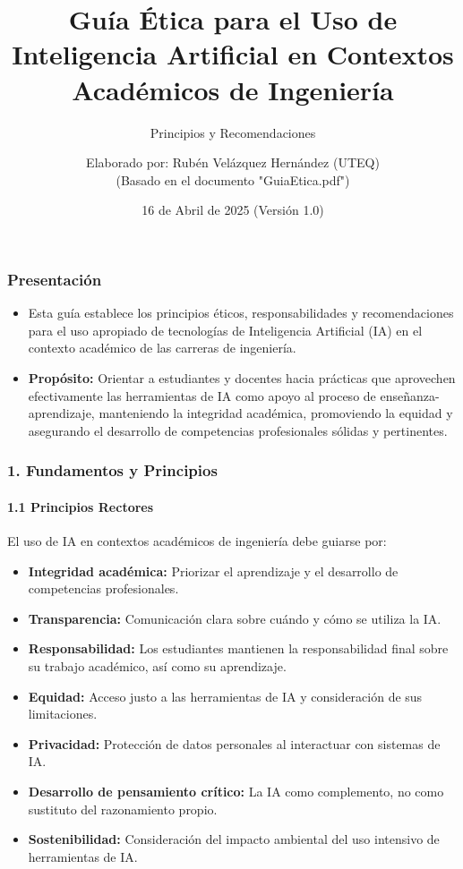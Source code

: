 \documentclass{beamer}
\title[Guía Ética IA - Ing.]{Guía Ética para el Uso de Inteligencia Artificial en Contextos Académicos de Ingeniería}
\subtitle{Principios y Recomendaciones}
\author{Elaborado por: Rubén Velázquez Hernández (UTEQ) \\ (Basado en el documento "GuiaEtica.pdf")}
\institute[UTEQ]{Universidad Tecnológica de Querétaro}
\date{16 de Abril de 2025 (Versión 1.0)}
\begin{document}
	
	\begin{frame}
		\titlepage
	\end{frame}
	
	\begin{frame}
		\frametitle{Presentación}
		\begin{itemize}
			\item Esta guía establece los principios éticos, responsabilidades y recomendaciones para el uso apropiado de tecnologías de Inteligencia Artificial (IA) en el contexto académico de las carreras de ingeniería.
			\item \textbf{Propósito:} Orientar a estudiantes y docentes hacia prácticas que aprovechen efectivamente las herramientas de IA como apoyo al proceso de enseñanza-aprendizaje, manteniendo la integridad académica, promoviendo la equidad y asegurando el desarrollo de competencias profesionales sólidas y pertinentes.
		\end{itemize}
	\end{frame}
	
	\begin{frame}
		\frametitle{1. Fundamentos y Principios}
		\framesubtitle{1.1 Principios Rectores}
		El uso de IA en contextos académicos de ingeniería debe guiarse por:
		\begin{itemize}
			\item \textbf{Integridad académica:} Priorizar el aprendizaje y el desarrollo de competencias profesionales.
			\item \textbf{Transparencia:} Comunicación clara sobre cuándo y cómo se utiliza la IA.
			\item \textbf{Responsabilidad:} Los estudiantes mantienen la responsabilidad final sobre su trabajo académico, así como su aprendizaje.
			\item \textbf{Equidad:} Acceso justo a las herramientas de IA y consideración de sus limitaciones.
			\item \textbf{Privacidad:} Protección de datos personales al interactuar con sistemas de IA.
			\item \textbf{Desarrollo de pensamiento crítico:} La IA como complemento, no como sustituto del razonamiento propio.
			\item \textbf{Sostenibilidad:} Consideración del impacto ambiental del uso intensivo de herramientas de IA.
		\end{itemize}
	\end{frame}
	
\end{document}

